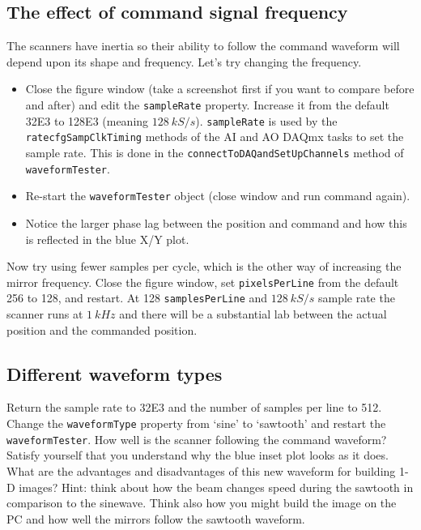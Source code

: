 \documentclass[a4paper]{report}
\begin{document}
\clearpage
\subsection{The effect of command signal frequency}
The scanners have inertia so their ability to follow the command waveform will depend upon its shape and frequency. 
Let's try changing the frequency. 

\begin{itemize}
\item Close the figure window (take a screenshot first if you want to compare before and after) and edit the \texttt{sampleRate} property.
Increase it from the default 32E3 to 128E3 (meaning $128~kS/s$). 
\texttt{sampleRate} is used by the \texttt{ratecfgSampClkTiming} methods of the AI and AO DAQmx tasks to set the sample rate.
This is done in the \texttt{connectToDAQandSetUpChannels} method of \texttt{waveformTester}.
\item Re-start the \texttt{waveformTester} object (close window and run command again). 
\item Notice the larger phase lag between the position and command and how this is reflected in the blue X/Y plot. 
\end{itemize}

\noindent
Now try using fewer samples per cycle, which is the other way of increasing the mirror frequency. 
Close the figure window, set \texttt{pixelsPerLine} from the default 256 to 128, and restart.
At 128 \texttt{samplesPerLine} and $128~kS/s$ sample rate the scanner runs at $1~kHz$ and there will be a substantial lab between the actual position and the commanded position.

\subsection{Different waveform types}
Return the sample rate to 32E3 and the number of samples per line to 512. 
Change the \texttt{waveformType} property from `sine' to `sawtooth' and restart the \texttt{waveformTester}. 
How well is the scanner following the command waveform? 
Satisfy yourself that you understand why the blue inset plot looks as it does. 
What are the advantages and disadvantages of this new waveform for building 1-D images?
Hint: think about how the beam changes speed during the sawtooth in comparison to the sinewave.
Think also how you might build the image on the PC and how well the mirrors follow the sawtooth waveform.


\clearpage
\end{document}
